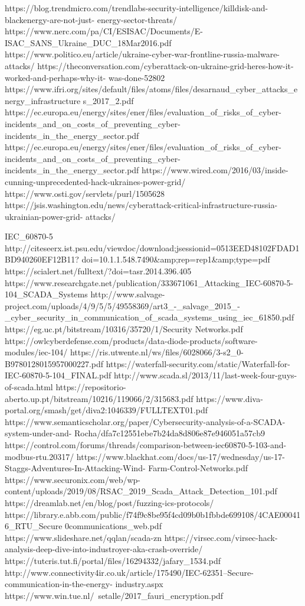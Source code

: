 https://blog.trendmicro.com/trendlabs-security-intelligence/killdisk-and-blackenergy-are-not-just-
energy-sector-threats/
https://www.nerc.com/pa/CI/ESISAC/Documents/E-ISAC_SANS_Ukraine_DUC_18Mar2016.pdf
https://www.politico.eu/article/ukraine-cyber-war-frontline-russia-malware-attacks/
https://theconversation.com/cyberattack-on-ukraine-grid-heres-how-it-worked-and-perhaps-why-it-
was-done-52802
https://www.ifri.org/sites/default/files/atoms/files/desarnaud_cyber_attacks_energy_infrastructure
s_2017_2.pdf
https://ec.europa.eu/energy/sites/ener/files/evaluation_of_risks_of_cyber-
incidents_and_on_costs_of_preventing_cyber-incidents_in_the_energy_sector.pdf
https://ec.europa.eu/energy/sites/ener/files/evaluation_of_risks_of_cyber-
incidents_and_on_costs_of_preventing_cyber-incidents_in_the_energy_sector.pdf
https://www.wired.com/2016/03/inside-cunning-unprecedented-hack-ukraines-power-grid/
https://www.osti.gov/servlets/purl/1505628
https://jsis.washington.edu/news/cyberattack-critical-infrastructure-russia-ukrainian-power-grid-
attacks/

IEC_60870-5
http://citeseerx.ist.psu.edu/viewdoc/download;jsessionid=0513EED48102FDAD1BD940260EF12B11?
doi=10.1.1.548.7490&amp;rep=rep1&amp;type=pdf
https://scialert.net/fulltext/?doi=tasr.2014.396.405
https://www.researchgate.net/publication/333671061_Attacking_IEC-60870-5-104_SCADA_Systems
http://www.salvage-project.com/uploads/4/9/5/5/49558369/art3_-_salvage_2015_-
_cyber_security_in_communication_of_scada_systems_using_iec_61850.pdf
https://eg.uc.pt/bitstream/10316/35720/1/Security%
Networks.pdf
https://owlcyberdefense.com/products/data-diode-products/software-modules/iec-104/
https://ris.utwente.nl/ws/files/6028066/3-s2_0-B9780128015957000227.pdf
https://waterfall-security.com/static/Waterfall-for-IEC-60870-5-104_FINAL.pdf
http://www.scada.sl/2013/11/last-week-four-guys-of-scada.html
https://repositorio-aberto.up.pt/bitstream/10216/119066/2/315683.pdf
https://www.diva-portal.org/smash/get/diva2:1046339/FULLTEXT01.pdf
https://www.semanticscholar.org/paper/Cybersecurity-analysis-of-a-SCADA-system-under-and-
Rocha/dfa7c12551ebe7b24da8d806e87e946051a57cb9
https://control.com/forums/threads/comparison-between-iec60870-5-103-and-modbus-rtu.20317/
https://www.blackhat.com/docs/us-17/wednesday/us-17-Staggs-Adventures-In-Attacking-Wind-
Farm-Control-Networks.pdf
https://www.securonix.com/web/wp-
content/uploads/2019/08/RSAC_2019_Scada_Attack_Detection_101.pdf
https://dreamlab.net/en/blog/post/fuzzing-ics-protocols/
https://library.e.abb.com/public/f74f9c8be95f4cd09b0b1fbbde699108/4CAE000416_RTU_Secure%
0communications_web.pdf
https://www.slideshare.net/qqlan/scada-zn
https://virsec.com/virsec-hack-analysis-deep-dive-into-industroyer-aka-crash-override/
https://tutcris.tut.fi/portal/files/16294332/jafary_1534.pdf
http://www.connectivity4ir.co.uk/article/175490/IEC-62351--Secure-communication-in-the-energy-
industry.aspx
https://www.win.tue.nl/~setalle/2017_fauri_encryption.pdf

